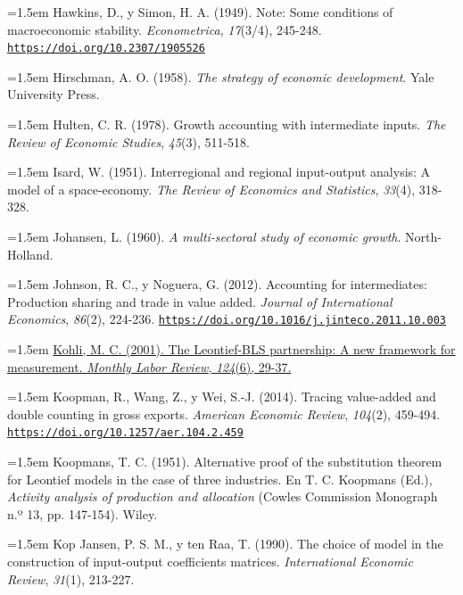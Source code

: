\documentclass[10pt,a4paper]{article}
\begin{document}
\noindent\hangindent=1.5em Hawkins, D., y Simon, H. A. (1949). Note: Some conditions of macroeconomic stability. \textit{Econometrica}, \textit{17}(3/4), 245-248. \href{https://doi.org/10.2307/1905526}{\nolinkurl{https://doi.org/10.2307/1905526}}

\noindent\hangindent=1.5em Hirschman, A. O. (1958). \textit{The strategy of economic development}. Yale University Press.

\noindent\hangindent=1.5em Hulten, C. R. (1978). Growth accounting with intermediate inputs. \textit{The Review of Economic Studies}, \textit{45}(3), 511-518.

\noindent\hangindent=1.5em Isard, W. (1951). Interregional and regional input-output analysis: A model of a space-economy. \textit{The Review of Economics and Statistics}, \textit{33}(4), 318-328.

\noindent\hangindent=1.5em Johansen, L. (1960). \textit{A multi-sectoral study of economic growth}. North-Holland.

\noindent\hangindent=1.5em Johnson, R. C., y Noguera, G. (2012). Accounting for intermediates: Production sharing and trade in value added. \textit{Journal of International Economics}, \textit{86}(2), 224-236. \href{https://doi.org/10.1016/j.jinteco.2011.10.003}{\nolinkurl{https://doi.org/10.1016/j.jinteco.2011.10.003}}

\noindent\hangindent=1.5em \href{https://www.bls.gov/opub/mlr/2001/06/art3full.pdf}{Kohli, M. C. (2001). The Leontief-BLS partnership: A new framework for measurement. \textit{Monthly Labor Review}, \textit{124}(6), 29-37.}

\noindent\hangindent=1.5em Koopman, R., Wang, Z., y Wei, S.-J. (2014). Tracing value-added and double counting in gross exports. \textit{American Economic Review}, \textit{104}(2), 459-494. \href{https://doi.org/10.1257/aer.104.2.459}{\nolinkurl{https://doi.org/10.1257/aer.104.2.459}}

\noindent\hangindent=1.5em Koopmans, T. C. (1951). Alternative proof of the substitution theorem for Leontief models in the case of three industries. En T. C. Koopmans (Ed.), \textit{Activity analysis of production and allocation} (Cowles Commission Monograph n.º 13, pp. 147-154). Wiley.

\noindent\hangindent=1.5em Kop Jansen, P. S. M., y ten Raa, T. (1990). The choice of model in the construction of input-output coefficients matrices. \textit{International Economic Review}, \textit{31}(1), 213-227.
\end{document}

